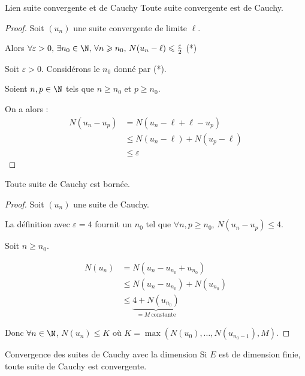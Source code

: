 \begin{proposition}{Lien suite convergente et de Cauchy}{}
    Toute suite convergente est de Cauchy.
\end{proposition}

\begin{proof}
    Soit $(u_n)$ une suite convergente de limite $\ell$.

    Alors $\forall \varepsilon > 0, \, \exists n_0 \in \N, \, \forall n \geqslant n_0, \, N(u_n - \ell) \leqslant \frac \varepsilon 2$ (*)

    Soit $\varepsilon > 0$. 
    Considérons le $n_0$ donné par (*). 

    Soient $n, p \in \N$ tels que $n \geqslant n_0$ et $p \geqslant n_0$.

    On a alors : 
    \begin{align*}
        N(u_n - u_p) & = N(u_n - \ell + \ell - u_p) \\
        & \leqslant N(u_n - \ell) + N(u_p - \ell) \\
        & \leqslant \varepsilon
    \end{align*}
\end{proof}

\begin{proposition}{}{}
    Toute suite de Cauchy est bornée. 
\end{proposition}

\begin{proof}
    Soit $(u_n)$ une suite de Cauchy.

    La définition avec $\varepsilon = 4$ fournit un $n_0$ tel que $\forall n, p \geqslant n_0, \, N(u_n - u_p) \leqslant 4$.

    Soit $n \geqslant n_0$. 

    \begin{align*}
        N(u_n) & = N(u_n - u_{n_0} + u_{n_0}) \\
        & \leqslant N(u_n - u_{n_0}) + N(u_{n_0}) \\
        & \leqslant  \underbrace{4 + N(u_{n_0})}_{= M ~ \text{constante}}
    \end{align*}

    Donc $\forall n \in \N$, $N(u_n) \leqslant K$ où $K = \max( N(u_0), \ldots, N(u_{n_0 - 1}), M)$.
\end{proof}

\begin{theoreme}{Convergence des suites de Cauchy avec la dimension}{}
    Si $E$ est de dimension finie, toute suite de Cauchy est convergente. 
\end{theoreme}

